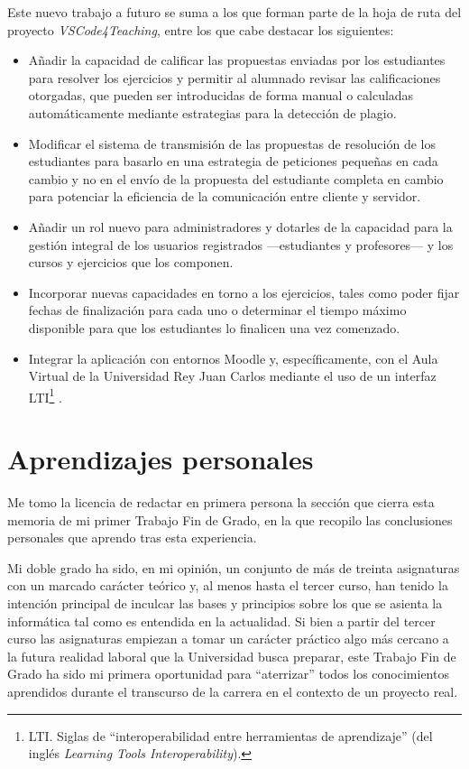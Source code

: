 Este nuevo trabajo a futuro se suma a los que forman parte de la hoja de ruta del proyecto \textit{VSCode4Teaching}, entre los que cabe destacar los siguientes:
\begin{itemize}
    \item Añadir la capacidad de calificar las propuestas enviadas por los estudiantes para resolver los ejercicios y permitir al alumnado revisar las calificaciones otorgadas, que pueden ser introducidas de forma manual o calculadas automáticamente mediante estrategias para la detección de plagio.
    \item Modificar el sistema de transmisión de las propuestas de resolución de los estudiantes para basarlo en una estrategia de peticiones pequeñas en cada cambio y no en el envío de la propuesta del estudiante completa en cambio para potenciar la eficiencia de la comunicación entre cliente y servidor.
    \item Añadir un rol nuevo para administradores y dotarles de la capacidad para la gestión integral de los usuarios registrados ---estudiantes y profesores--- y los cursos y ejercicios que los componen.
    \item Incorporar nuevas capacidades en torno a los ejercicios, tales como poder fijar fechas de finalización para cada uno o determinar el tiempo máximo disponible para que los estudiantes lo finalicen una vez comenzado.
    \item Integrar la aplicación con entornos Moodle \cite{Moodle} y, específicamente, con el Aula Virtual de la Universidad Rey Juan Carlos mediante el uso de un interfaz LTI\footnote{LTI. Siglas de ``interoperabilidad entre herramientas de aprendizaje'' (del inglés \textit{Learning Tools Interoperability}).} \cite{LTI_Spec}.
\end{itemize}

\section{Aprendizajes personales}
\label{subsec:aprendizajesPersonales}
Me tomo la licencia de redactar en primera persona la sección que cierra esta memoria de mi primer Trabajo Fin de Grado, en la que recopilo las conclusiones personales que aprendo tras esta experiencia.

Mi doble grado ha sido, en mi opinión, un conjunto de más de treinta asignaturas con un marcado carácter teórico y, al menos hasta el tercer curso, han tenido la intención principal de inculcar las bases y principios sobre los que se asienta la informática tal como es entendida en la actualidad. Si bien a partir del tercer curso las asignaturas empiezan a tomar un carácter práctico algo más cercano a la futura realidad laboral que la Universidad busca preparar, este Trabajo Fin de Grado ha sido mi primera oportunidad para ``aterrizar'' todos los conocimientos aprendidos durante el transcurso de la carrera en el contexto de un proyecto real.

